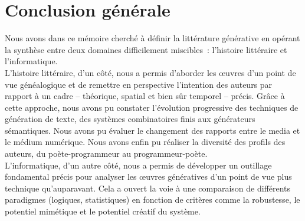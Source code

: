 \documentclass{article}
\begin{document}
		
	
		\newpage
	\section{Conclusion générale}
		Nous avons dans ce mémoire cherché à définir la littérature générative en opérant la synthèse entre deux domaines difficilement miscibles~: l'histoire littéraire et l'informatique.\\
		L'histoire littéraire, d'un côté, nous a permis d'aborder les œuvres d'un point de vue généalogique et de remettre en perspective l'intention des auteurs par rapport à un cadre -- théorique, spatial et bien sûr temporel -- précis. Grâce à cette approche, nous avons pu constater l'évolution progressive des techniques de génération de texte, des systèmes combinatoires finis aux générateurs sémantiques. Nous avons pu évaluer le changement des rapports entre le media et le médium numérique. Nous avons enfin pu réaliser la diversité des profils des auteurs, du poète-programmeur au programmeur-poète.\\
		L'informatique, d'un autre côté, nous a permis de développer un outillage fondamental précis pour analyser les œuvres génératives d'un point de vue plus technique qu'auparavant. Cela a ouvert la voie à une comparaison de différents paradigmes (logiques, statistiques) en fonction de critères comme la robustesse, le potentiel mimétique et le potentiel créatif du système.\\
		
\end{document}

